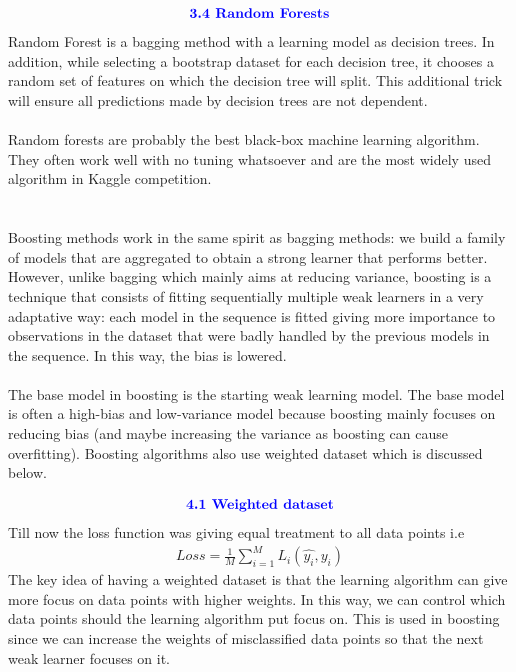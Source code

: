 \documentclass{homework}
\begin{document}
\begin{align*}
    \textcolor{blue}{ \text{{\textbf{3.4 Random Forests}}}}
 \end{align*}
Random Forest is a bagging method with a learning model as decision trees. In addition, while selecting a bootstrap dataset for each decision tree, it chooses a random set of features on which the decision tree will split. This additional trick will ensure all predictions made by decision trees are not dependent. \\
\\
Random forests are probably the best black-box machine learning algorithm. They often work well with no tuning whatsoever and are the most widely used algorithm in Kaggle competition.

\section{}
Boosting methods work in the same spirit as bagging methods: we build a family of models that are aggregated to obtain a strong learner that performs better. However, unlike bagging which mainly aims at reducing variance, boosting is a technique that consists of fitting sequentially multiple weak learners in a very adaptative way: each model in the sequence is fitted giving more importance to observations in the dataset that were badly handled by the previous models in the sequence. In this way, the bias is lowered.  \\
\\
The base model in boosting is the starting weak learning model. The base model is often a high-bias and low-variance model because boosting mainly focuses on reducing bias (and maybe increasing the variance as boosting can cause overfitting). Boosting algorithms also use weighted dataset which is discussed below.

\begin{align*}
    \textcolor{blue}{ \text{{\textbf{4.1 Weighted dataset}}}}
 \end{align*}
Till now the loss function was giving equal treatment to all data points i.e 
\begin{align*}
    Loss = \frac{1}{M}\sum_{i=1}^{M} L_i(\hat{y_i},y_i)
\end{align*}
The key idea of having a weighted dataset is that the learning algorithm can give more focus on data points with higher weights. In this way, we can control which data points should the learning algorithm put focus on. This is used in boosting since we can increase the weights of misclassified data points so that the next weak learner focuses on it.
\end{document}

